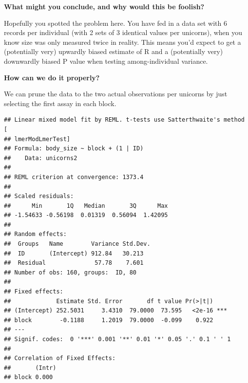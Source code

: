 \documentclass[
  12pt,
]{book}
\makeatletter
\newenvironment{Shaded}{\begin{snugshade}}{\end{snugshade}}
\newcommand{\DataTypeTok}[1]{\textcolor[rgb]{0.13,0.29,0.53}{#1}}
\newcommand{\DecValTok}[1]{\textcolor[rgb]{0.00,0.00,0.81}{#1}}
\newcommand{\KeywordTok}[1]{\textcolor[rgb]{0.13,0.29,0.53}{\textbf{#1}}}
\newcommand{\NormalTok}[1]{#1}
\newcommand{\OperatorTok}[1]{\textcolor[rgb]{0.81,0.36,0.00}{\textbf{#1}}}
\newcommand{\StringTok}[1]{\textcolor[rgb]{0.31,0.60,0.02}{#1}}
\newenvironment{kframe}{%
\medskip{}
\setlength{\fboxsep}{.8em}
\def\at@end@of@kframe{}%
\ifinner\ifhmode%
 \def\at@end@of@kframe{\end{minipage}}%
 \begin{minipage}{\columnwidth}%
\fi\fi%
\def\FrameCommand##1{\hskip\@totalleftmargin \hskip-\fboxsep
\colorbox{incolor}{##1}\hskip-\fboxsep
    \hskip-\linewidth \hskip-\@totalleftmargin \hskip\columnwidth}%
\MakeFramed {\advance\hsize-\width
  \@totalleftmargin\z@ \linewidth\hsize
  \@setminipage}}%
{\par\unskip\endMakeFramed%
\at@end@of@kframe}
\newenvironment{rmdblock}[1]
 {
 \begin{itemize}
 \renewcommand{\labelitemi}{
   \raisebox{-.7\height}[0pt][0pt]{
     {\setkeys{Gin}{width=3em,keepaspectratio}\texttt{[image: images/icons/\#1]}}
   }
 }
 \begin{kframe}
 \setlength{\fboxsep}{1em}
 \item
 }
 {
 \end{kframe}
 \end{itemize}
 }
\newenvironment{rmdcode}
  {\begin{rmdblock}{code}}
  {\end{rmdblock}}
\makeatother
\begin{document}
\begin{rmdcode}
\textbf{What might you conclude, and why would this be foolish?}
\end{rmdcode}

Hopefully you spotted the problem here. You have fed in a data set with 6 records per individual (with 2 sets of 3 identical values per unicorns), when you know size was only measured twice in reality. This means you'd expect to get a (potentially very) upwardly biased estimate of R and a (potentially very) downwardly biased P value when testing among-individual variance.

\begin{rmdcode}
\textbf{How can we do it properly?}
\end{rmdcode}

We can prune the data to the two actual observations per unicorns by just selecting the first assay in each block.

\begin{Shaded}
\end{Shaded}

\begin{verbatim}
## Linear mixed model fit by REML. t-tests use Satterthwaite's method [
## lmerModLmerTest]
## Formula: body_size ~ block + (1 | ID)
##    Data: unicorns2
## 
## REML criterion at convergence: 1373.4
## 
## Scaled residuals: 
##      Min       1Q   Median       3Q      Max 
## -1.54633 -0.56198  0.01319  0.56094  1.42095 
## 
## Random effects:
##  Groups   Name        Variance Std.Dev.
##  ID       (Intercept) 912.84   30.213  
##  Residual              57.78    7.601  
## Number of obs: 160, groups:  ID, 80
## 
## Fixed effects:
##             Estimate Std. Error       df t value Pr(>|t|)    
## (Intercept) 252.5031     3.4310  79.0000  73.595   <2e-16 ***
## block        -0.1188     1.2019  79.0000  -0.099    0.922    
## ---
## Signif. codes:  0 '***' 0.001 '**' 0.01 '*' 0.05 '.' 0.1 ' ' 1
## 
## Correlation of Fixed Effects:
##       (Intr)
## block 0.000
\end{verbatim}
\end{document}
